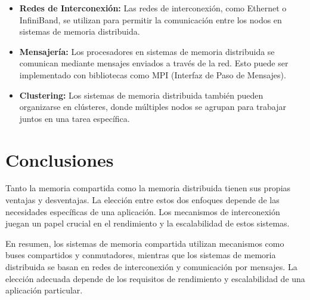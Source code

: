 \begin{itemize}
    \item \textbf{Redes de Interconexión:} Las redes de interconexión, como Ethernet o InfiniBand, se utilizan para permitir la comunicación entre los nodos en sistemas de memoria distribuida.
    
    \item \textbf{Mensajería:} Los procesadores en sistemas de memoria distribuida se comunican mediante mensajes enviados a través de la red. Esto puede ser implementado con bibliotecas como MPI (Interfaz de Paso de Mensajes).
    
    \item \textbf{Clustering:} Los sistemas de memoria distribuida también pueden organizarse en clústeres, donde múltiples nodos se agrupan para trabajar juntos en una tarea específica.
\end{itemize}

\section{Conclusiones}
Tanto la memoria compartida como la memoria distribuida tienen sus propias ventajas y desventajas. La elección entre estos dos enfoques depende de las necesidades específicas de una aplicación. Los mecanismos de interconexión juegan un papel crucial en el rendimiento y la escalabilidad de estos sistemas.

En resumen, los sistemas de memoria compartida utilizan mecanismos como buses compartidos y conmutadores, mientras que los sistemas de memoria distribuida se basan en redes de interconexión y comunicación por mensajes. La elección adecuada depende de los requisitos de rendimiento y escalabilidad de una aplicación particular.

